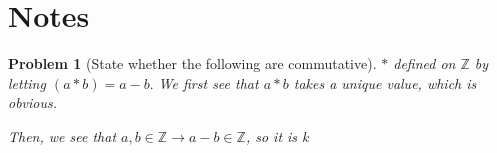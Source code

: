 \documentclass[11pt]{article}
\title{\assignment}
\author{\studentname}
\date{\term}
\theoremstyle{notestyle}
\newtheorem{problem}{Problem}[section]
\theoremstyle{definition}
\newenvironment{solution}{\begin{proof}[Solution]}{\end{proof}}
\newcommand{\1}{\mathbf{1}}
\begin{document}
\maketitle


\section{Notes}
\begin{problem}[State whether the following are commutative]
\label{prob:label}
$*$ defined on $\mathbb{Z} $ by letting $(a * b) = a - b.$
We first see that $a * b$ takes a unique value, which is obvious. \par Then,
we see that $a, b \in \mathbb{Z} \rightarrow a - b \in \mathbb{Z}$, so it is k
\par 
\end{problem}
\end{document}
